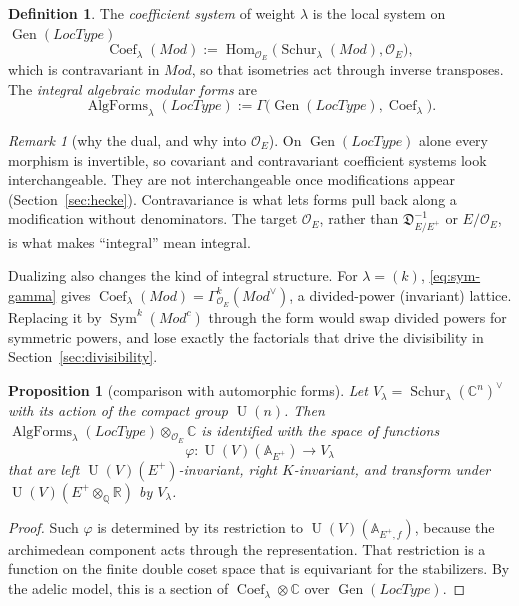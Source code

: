 \documentclass[11pt]{amsart}
\newtheorem{proposition}[theorem]{Proposition}
\theoremstyle{definition}
\newtheorem{definition}[theorem]{Definition}
\theoremstyle{remark}
\newtheorem{remark}[theorem]{Remark}
\newcommand{\OEring}{\mathcal{O}_E}
\newcommand{\Md}{\mathit{Mod}}
\newcommand{\LocType}{\mathit{LocType}}
\DeclareMathOperator{\Hom}{Hom}
\DeclareMathOperator{\Gen}{Gen}
\DeclareMathOperator{\Coef}{Coef}
\DeclareMathOperator{\AlgForms}{AlgForms}
\DeclareMathOperator{\Schur}{Schur}
\DeclareMathOperator{\Sym}{Sym}
\DeclareMathOperator{\U}{U}
\newcommand{\A}{\mathbb{A}}
\newcommand{\Q}{\mathbb{Q}}
\newcommand{\R}{\mathbb{R}}
\newcommand{\C}{\mathbb{C}}
\newcommand{\Diff}{\mathfrak{D}_{E/E^+}}
\newcommand{\dual}{^{\vee}}
\newcommand{\conj}{^{c}}
\begin{document}
\begin{definition}\label{def:coef}
The \emph{coefficient system} of weight $\lambda$ is the local system on $\Gen(\LocType)$
\[
\Coef_\lambda(\Md):=\Hom_{\OEring}\bigl(\Schur_\lambda(\Md),\OEring\bigr),
\]
which is contravariant in $\Md$, so that isometries act through inverse transposes. The \emph{integral algebraic modular forms} are
\[
\AlgForms_\lambda(\LocType):=\Gamma\bigl(\Gen(\LocType),\Coef_\lambda\bigr).
\]
\end{definition}

\begin{remark}[why the dual, and why into $\OEring$]
On $\Gen(\LocType)$ alone every morphism is invertible, so covariant and contravariant coefficient systems look interchangeable. They are not interchangeable once modifications appear (Section~\ref{sec:hecke}). Contravariance is what lets forms pull back along a modification without denominators. The target $\OEring$, rather than $\Diff^{-1}$ or $E/\OEring$, is what makes ``integral'' mean integral.

Dualizing also changes the kind of integral structure. For $\lambda=(k)$, \eqref{eq:sym-gamma} gives $\Coef_\lambda(\Md)=\Gamma^k_{\OEring}(\Md\dual)$, a divided-power (invariant) lattice. Replacing it by $\Sym^k(\Md\conj)$ through the form would swap divided powers for symmetric powers, and lose exactly the factorials that drive the divisibility in Section~\ref{sec:divisibility}.
\end{remark}

\begin{proposition}[comparison with automorphic forms]
Let $V_\lambda=\Schur_\lambda(\C^n)^\vee$ with its action of the compact group $\U(n)$. Then $\AlgForms_\lambda(\LocType)\otimes_{\OEring}\C$ is identified with the space of functions
\[
\varphi\colon\U(V)(\A_{E^+})\to V_\lambda
\]
that are left $\U(V)(E^+)$-invariant, right $K$-invariant, and transform under $\U(V)(E^+\otimes_{\Q}\R)$ by $V_\lambda$.
\end{proposition}

\begin{proof}
Such $\varphi$ is determined by its restriction to $\U(V)(\A_{E^+,f})$, because the archimedean component acts through the representation. That restriction is a function on the finite double coset space that is equivariant for the stabilizers. By the adelic model, this is a section of $\Coef_\lambda\otimes\C$ over $\Gen(\LocType)$.
\end{proof}
\end{document}
